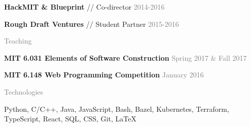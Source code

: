 \documentclass[11pt]{article}
\newcommand{\rsection}[1]{\vspace{1.5em}\textcolor{gray}{\Large \robotoslab #1}\vspace{0.5em}}
\newcommand{\bt}[1]{\textbf{#1}} %
\newcommand{\gap}[0]{\vspace{0.3em}} %
\newcommand{\sep}[0]{ // } %
\newcommand{\gray}[1]{\textcolor{gray}{#1}}
\begin{document}
\bt{HackMIT \& Blueprint}\sep Co-director \hfill \gray{2014-2016}

\gap

\bt{Rough Draft Ventures}\sep Student Partner \hfill \gray{2015-2016}


\rsection{Teaching}

\bt{MIT 6.031 Elements of Software Construction} \hfill \gray{Spring 2017 \& Fall 2017}

\gap

\bt{MIT 6.148 Web Programming Competition} \hfill \gray{January 2016}


\rsection{Technologies}

Python, C/C++, Java, JavaScript, Bash, Bazel, Kubernetes, Terraform, TypeScript, React, SQL, CSS, Git, {\selectfont\LaTeX}
\end{document}
